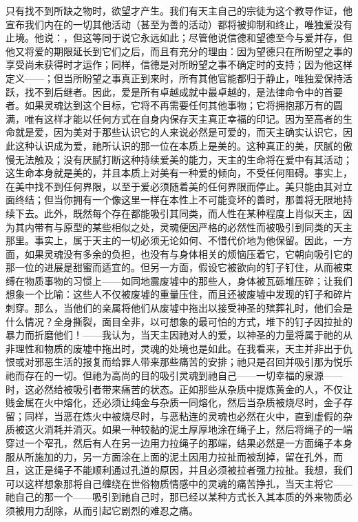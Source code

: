 只有找不到所缺之物时，欲望才产生。我们有天主自己的宗徒为这个教导作证，他宣布我们内在的一切其他活动（甚至为善的活动）都将被抑制和终止，唯独爱没有止境。他说：，但这等同于说它永远如此；尽管他说信德和望德至今与爱并存，但他又将爱的期限延长到它们之后，而且有充分的理由：因为望德只在所盼望之事的享受尚未获得时才运作；同样，信德是对所盼望之事不确定时的支持；因为他这样定义——；但当所盼望之事真正到来时，所有其他官能都归于静止，唯独爱保持活跃，找不到后继者。因此，爱是所有卓越成就中最卓越的，是法律命令中的首要者。如果灵魂达到这个目标，它将不再需要任何其他事物；它将拥抱那万有的圆满，唯有这样才能以任何方式在自身内保存天主真正幸福的印记。因为至高者的生命就是爱，因为美对于那些认识它的人来说必然是可爱的，而天主确实认识它，因此这种认识成为爱，祂所认识的那一位在本质上是美的。这种真正的美，厌腻的傲慢无法触及；没有厌腻打断这种持续爱美的能力，天主的生命将在爱中有其活动；这生命本身就是美的，并且本质上对美有一种爱的倾向，不受任何阻碍。事实上，在美中找不到任何界限，以至于爱必须随着美的任何界限而停止。美只能由其对立面终结；但当你拥有一个像这里一样在本性上不可能变坏的善时，那善将无限地持续下去。此外，既然每个存在都能吸引其同类，而人性在某种程度上肖似天主，因为其内带有与原型的某些相似之处，灵魂便因严格的必然性而被吸引到同类的天主那里。事实上，属于天主的一切必须无论如何、不惜代价地为他保留。因此，一方面，如果灵魂没有多余的负担，也没有与身体相关的烦恼压着它，它朝向吸引它的那一位的进展是甜蜜而适宜的。但另一方面，假设它被欲向的钉子钉住，从而被束缚在物质事物的习惯上——如同地震废墟中的那些人，身体被瓦砾堆压碎；让我们想象一个比喻：这些人不仅被废墟的重量压住，而且还被废墟中发现的钉子和碎片刺穿。那么，当他们的亲属将他们从废墟中拖出以接受神圣的殡葬礼时，他们会是什么情况？全身撕裂，面目全非，以可想象的最可怕的方式，堆下的钉子因拉扯的暴力而折磨他们！——我认为，当天主因祂对人的爱，以神圣的力量将属于祂的从非理性和物质的废墟中拖出时，灵魂的处境也是如此。在我看来，天主并非出于仇恨或对邪恶生活的报复而给罪人带来那些痛苦的安排；祂只是召回并吸引那为悦乐祂而存在的一切。但祂为高尚的目的吸引灵魂到祂自己——一切幸福的泉源——时，这必然给被吸引者带来痛苦的状态。正如那些从杂质中提炼黄金的人，不仅让贱金属在火中熔化，还必须让纯金与杂质一同熔化，然后当杂质被烧尽时，金子存留；同样，当恶在炼火中被烧尽时，与恶粘连的灵魂也必然在火中，直到虚假的杂质被这火消耗并消灭。如果一种较黏的泥土厚厚地涂在绳子上，然后将绳子的一端穿过一个窄孔，然后有人在另一边用力拉绳子的那端，结果必然是一方面绳子本身服从所施加的力，另一方面涂在上面的泥土因用力拉扯而被刮掉，留在孔外，而且，这正是绳子不能顺利通过孔道的原因，并且必须被拉者强力拉扯。我想，我们可以这样想象那将自己缠绕在世俗物质情感中的灵魂的痛苦挣扎，当天主将它——祂自己的那一个——吸引到祂自己时，那已经以某种方式长入其本质的外来物质必须被用力刮除，从而引起它剧烈的难忍之痛。\par

